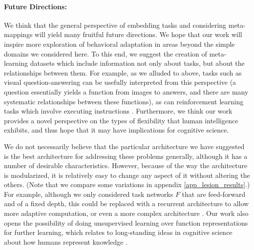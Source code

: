 \documentclass{article}
\begin{document}
\paragraph{Future Directions:} We think that the general perspective of embedding tasks and considering meta-mappings will yield many fruitful future directions. We hope that our work will inspire more exploration of behavioral adaptation in areas beyond the simple domains we considered here. To this end, we suggest the creation of meta-learning datasets which include information not only about tasks, but about the relationships between them. For example, as we alluded to above, tasks such as visual question-answering \citep[e.g.][]{Antol2015} can be usefully interpreted from this perspective (a question essentially yields a function from images to answers, and there are many systematic relationships between these functions), as can reinforcement learning tasks which involve executing instructions \citep[e.g.][]{Hermann2017, Co-Reyes2019}. Furthermore, we think our work provides a novel perspective on the types of flexibility that human intelligence exhibits, and thus hope that it may have implications for cognitive science. \par 
We do not necessarily believe that the particular architecture we have suggested is the best architecture for addressing these problems generally, although it has a number of desirable characteristics. However, because of the way the architecture is modularized, it is relatively easy to change any aspect of it without altering the others. (Note that we compare some variations in appendix \ref{app_lesion_results}.) For example, although we only considered task networks $F$ that are feed-forward and of a fixed depth, this could be replaced with a recurrent architecture to allow more adaptive computation, or even a more complex architecture \citep[e.g.][]{Reed2015, Graves2016}. Our work also opens the possibility of doing unsupervised learning over function representations for further learning, which relates to long-standing ideas in cognitive science about how humans represent knowledge \citep{Clark1993}. \par 
\end{document}
